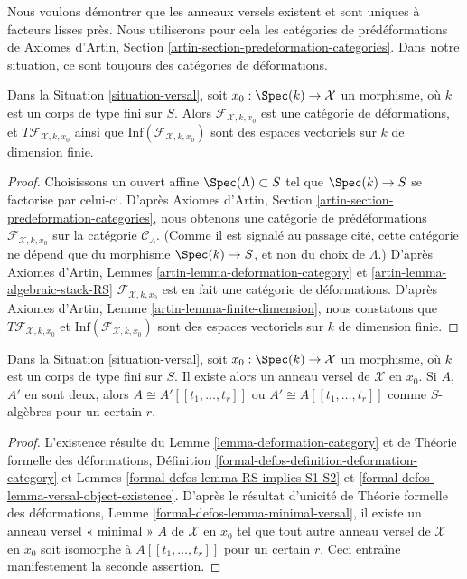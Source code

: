 \noindent
Nous voulons démontrer que les anneaux versels existent et sont uniques à
facteurs lisses près. Nous utiliserons pour cela les catégories de prédéformations de
Axiomes d'Artin, Section \ref{artin-section-predeformation-categories}.
Dans notre situation, ce sont toujours des catégories de déformations.

\begin{lemma}
\label{lemma-deformation-category}
Dans la Situation \ref{situation-versal}, soit $x_0 : \Spec(k) \to \mathcal{X}$
un morphisme, où $k$ est un corps de type fini sur $S$.
Alors $\mathcal{F}_{\mathcal{X}, k, x_0}$
est une catégorie de déformations, et $T\mathcal{F}_{\mathcal{X}, k, x_0}$
ainsi que $\text{Inf}(\mathcal{F}_{\mathcal{X}, k, x_0})$
sont des espaces vectoriels sur $k$ de dimension finie.
\end{lemma}

\begin{proof}
Choisissons un ouvert affine $\Spec(\Lambda) \subset S$ tel que
$\Spec(k) \to S$ se factorise par celui-ci.
D'après Axiomes d'Artin, Section \ref{artin-section-predeformation-categories},
nous obtenons une catégorie de prédéformations
$\mathcal{F}_{\mathcal{X}, k, x_0}$
sur la catégorie $\mathcal{C}_\Lambda$.
(Comme il est signalé au passage cité, cette catégorie ne dépend que
du morphisme $\Spec(k) \to S$, et non du choix de
$\Lambda$.) D'après Axiomes d'Artin, Lemmes
\ref{artin-lemma-deformation-category} et
\ref{artin-lemma-algebraic-stack-RS}
$\mathcal{F}_{\mathcal{X}, k, x_0}$ est en fait une catégorie de déformations.
D'après Axiomes d'Artin, Lemme \ref{artin-lemma-finite-dimension},
nous constatons que $T\mathcal{F}_{\mathcal{X}, k, x_0}$
et $\text{Inf}(\mathcal{F}_{\mathcal{X}, k, x_0})$
sont des espaces vectoriels sur $k$ de dimension finie.
\end{proof}

\begin{lemma}
\label{lemma-versal-ring}
Dans la Situation \ref{situation-versal}, soit $x_0 : \Spec(k) \to \mathcal{X}$
un morphisme, où $k$ est un corps de type fini sur $S$.
Il existe alors un anneau versel de $\mathcal{X}$ en $x_0$. Si
$A$, $A'$ en sont deux, alors $A \cong A'[[t_1, \ldots, t_r]]$
ou $A' \cong A[[t_1, \ldots, t_r]]$ comme $S$-algèbres
pour un certain $r$.
\end{lemma}

\begin{proof}
L'existence résulte du Lemme \ref{lemma-deformation-category} et de
Théorie formelle des déformations,
Définition \ref{formal-defos-definition-deformation-category} et
Lemmes \ref{formal-defos-lemma-RS-implies-S1-S2} et
\ref{formal-defos-lemma-versal-object-existence}.
D'après le résultat d'unicité de
Théorie formelle des déformations, Lemme \ref{formal-defos-lemma-minimal-versal},
il existe un anneau versel « minimal » $A$ de $\mathcal{X}$ en $x_0$
tel que tout autre anneau versel de $\mathcal{X}$ en $x_0$ soit
isomorphe à $A[[t_1, \ldots, t_r]]$ pour un certain $r$.
Ceci entraîne manifestement la seconde assertion.
\end{proof}

